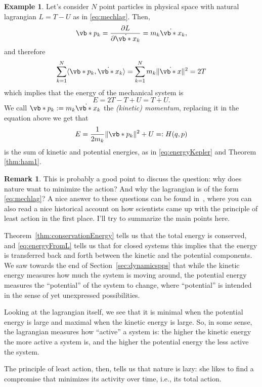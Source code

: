 \documentclass[english,fontsize=11pt,paper=b5]{scrbook}
\numberwithin{equation}{chapter}
\theoremstyle{definition}
\newtheorem{remark}{Remark}[chapter]
\newtheorem{example}{Example}[chapter]
\begin{document}
    \begin{example}\label{ex:natlagham}
      Let's consider $N$ point particles in physical space with natural lagrangian $L = T - U$ as in \eqref{eq:mechlag}.
      Then,
      \begin{equation}
        \vb*{p}_k = \frac{\partial L}{\partial \dot{\vb*{x}}_k} = m_k \dot{\vb*{x}}_k,
      \end{equation}
      and therefore
      \begin{equation}
        \sum_{k=1}^{N} \langle\vb*{p}_k, \dot{\vb*{x}}_k\rangle = \sum_{k=1}^{N} m_k \|\dot{\vb*{x}}\|^2 = 2 T
      \end{equation}
      which implies that the energy of the mechanical system is
      \begin{equation}\label{eq:energyFromL}
        E = 2T - T + U = T + U.
      \end{equation}
      We call $\vb*{p}_k := m_k \dot{\vb*{x}}_k$ the \emph{(kinetic) momentum}, replacing it in the equation above we get that
      \begin{equation}
        E = \frac{1}{2 m_k}\|\vb*{p}_k\|^2 + U =: H(q,p)
      \end{equation}
      is the sum of kinetic and potential energies, as in \eqref{eq:energyKepler} and Theorem \ref{thm:ham1}.
    \end{example}

    \begin{remark}
      This is probably a good point to discuss the question: why does nature want to minimize the action? And why the lagrangian is of the form \eqref{eq:mechlag}?
      A nice answer to these questions can be found in~\cite{lectures:baez}, where you can also read a nice historical account on how scientists came up with the principle of least action in the first place.
      I'll try to summarize the main points here.

      Theorem~\ref{thm:conservationEnergy} tells us that the total energy is conserved, and \eqref{eq:energyFromL} tells us that for closed systems this implies that the energy is transferred back and forth between the kinetic and the potential components.
      We saw towards the end of Section~\ref{sec:dynamicspps} that while the kinetic energy measures how much the system is moving around, the potential energy measures the ``potential'' of the system to change, where ``potential'' is intended in the sense of yet unexpressed possibilities.

      Looking at the lagrangian itself, we see that it is minimal when the potential energy is large and maximal when the kinetic energy is large.
      So, in some sense, the lagrangian measures how ``active'' a system is: the higher the kinetic energy the more active a system is, and the higher the potential energy the less active the system.

      The principle of least action, then, tells us that nature is lazy: she likes to find a compromise that minimizes its activity over time, i.e., its total action.
    \end{remark}
\end{document}

